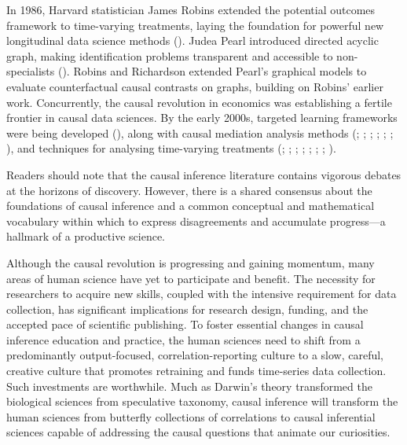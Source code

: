 \documentclass[
  single column]{article}
\begin{document}
In 1986, Harvard statistician James Robins extended the potential
outcomes framework to time-varying treatments, laying the foundation for
powerful new longitudinal data science methods
(). Judea Pearl introduced
directed acyclic graph, making identification problems transparent and
accessible to non-specialists ().
Robins and Richardson extended Pearl's graphical models to evaluate
counterfactual causal contrasts on graphs, building on Robins' earlier
work. Concurrently, the causal revolution in economics was establishing
a fertile frontier in causal data sciences. By the early 2000s, targeted
learning frameworks were being developed
(), along with
causal mediation analysis methods (; ;
;
;
;
;
), and
techniques for analysing time-varying treatments
(;
;
;
;
;
;
;
).

Readers should note that the causal inference literature contains
vigorous debates at the horizons of discovery. However, there is a
shared consensus about the foundations of causal inference and a common
conceptual and mathematical vocabulary within which to express
disagreements and accumulate progress---a hallmark of a productive
science.

Although the causal revolution is progressing and gaining momentum, many
areas of human science have yet to participate and benefit. The
necessity for researchers to acquire new skills, coupled with the
intensive requirement for data collection, has significant implications
for research design, funding, and the accepted pace of scientific
publishing. To foster essential changes in causal inference education
and practice, the human sciences need to shift from a predominantly
output-focused, correlation-reporting culture to a slow, careful,
creative culture that promotes retraining and funds time-series data
collection. Such investments are worthwhile. Much as Darwin's theory
transformed the biological sciences from speculative taxonomy, causal
inference will transform the human sciences from butterfly collections
of correlations to causal inferential sciences capable of addressing the
causal questions that animate our curiosities.
\end{document}
